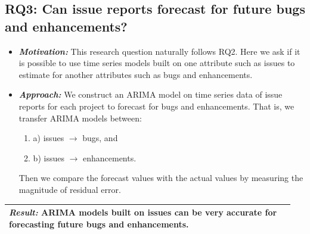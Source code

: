 \documentclass[sigconf, preprint]{acmart}
\begin{document}
\subsection*{RQ3: Can issue reports forecast for future bugs and enhancements?}
\begin{itemize}[leftmargin=-1pt]

\item[] \textit{\textbf{Motivation:}} This research question naturally follows 
RQ2. 
Here we ask if it is possible to use time series models built on one attribute 
such as issues to estimate for another attributes such as bugs and enhancements.

\item[] \textit{\textbf{Approach:}} We construct an ARIMA model on time series 
data of 
issue reports for each project to forecast for bugs and enhancements. That 
is, we transfer ARIMA models between:
\begin{enumerate}
\item[] a) issues $\rightarrow$ bugs, and 	
\item[] b) issues $\rightarrow$ enhancements.
\end{enumerate} 
Then we compare the forecast values with the actual values by measuring the 
magnitude of residual error.\\[-0.4cm]

 
\end{itemize}

\vspace{1mm}
\noindent\begin{minipage}{\linewidth}
	\begin{center}
		\begin{tabular}{p{0.95\linewidth}}
			\arrayrulecolor{Gray}
			\hline
			 
			\rowcolor{Gray}   \textit{\textbf{Result:}} ARIMA models built on issues 
can be 
very accurate for forecasting future bugs and enhancements.\\\hline
		\end{tabular}
	\end{center}
\end{minipage}\bigstrut[t]\\[-0.4cm]
\end{document}
